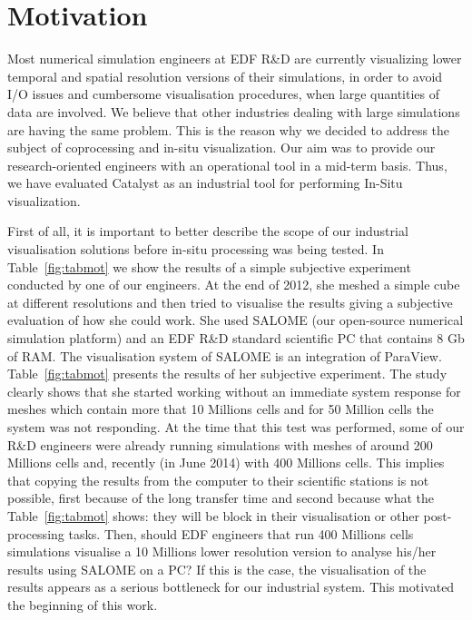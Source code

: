 \section{Motivation}
\label{sec:motivation}

Most numerical simulation engineers at EDF R\&D are currently visualizing lower
temporal and spatial resolution versions of their simulations, in order to avoid
I/O issues and cumbersome visualisation procedures, when large quantities of
data are involved. We believe that other industries dealing with large
simulations are having the same problem. This is the reason why we decided to
address the subject of coprocessing and in-situ visualization. Our aim was to
provide our research-oriented engineers with an operational tool in a mid-term
basis. Thus, we have evaluated Catalyst as an industrial tool for performing
In-Situ visualization. 

First of all, it is important to better describe the scope of our industrial
visualisation solutions before in-situ processing was being tested. In
Table~\ref{fig:tabmot}
we show the results of a simple subjective experiment conducted by one of our
engineers. At the end of 2012, she meshed a simple cube at different resolutions
and then tried to visualise the results giving a subjective evaluation of how
she could work. She used SALOME (our open-source numerical simulation platform)
and an EDF R\&D standard scientific PC that contains 8 Gb of RAM. The
visualisation system of SALOME is an integration of ParaView.
Table~\ref{fig:tabmot} presents
the results of her subjective experiment. The study clearly shows that she
started working without an immediate system response for meshes which contain
more that 10 Millions cells and for 50 Million cells the system was not
responding. At the time that this test was performed, some of our R\&D engineers
were already running simulations with meshes of around 200 Millions cells and,
recently (in June 2014) with 400 Millions cells. This implies that copying the
results from the computer to their scientific stations is not possible, first
because of the long transfer time and second because what the
Table~\ref{fig:tabmot} shows:
they will be block in their visualisation or other post-processing tasks. Then,
should EDF engineers that run 400 Millions cells simulations visualise a 10
Millions lower resolution version to analyse his/her results using SALOME on a
PC? If this is the case, the visualisation of the results appears as a serious
bottleneck for our industrial system. This motivated the beginning of this work.

